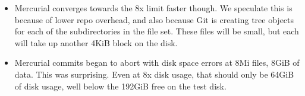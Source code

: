 \begin{itemize}
    \item Mercurial converges towards the 8x limit faster though. We speculate
        this is because of lower repo overhead, and also because Git is creating
        \gls{tree} objects for each of the subdirectories in the file set. These
        files will be small, but each will take up another 4KiB block on the
        disk.

    \item Mercurial commits began to abort with disk space errors at 8Mi files,
        8GiB of data. This was surprising. Even at 8x disk usage, that should
        only be 64GiB of disk usage, well below the 192GiB free on the test
        disk.

\end{itemize}

%
